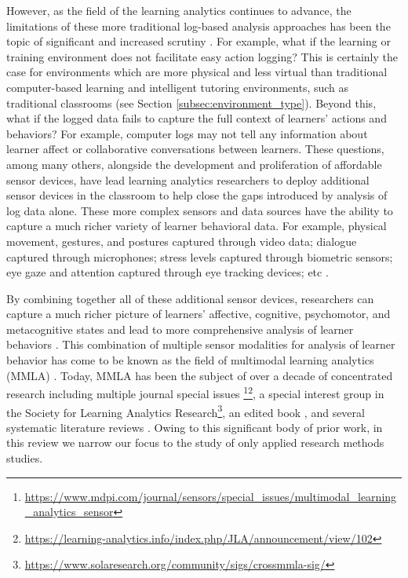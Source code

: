 \documentclass[manuscript,screen,review]{acmart}
\begin{document}
However, as the field of the learning analytics continues to advance, the limitations of these more traditional log-based analysis approaches has been the topic of significant and increased scrutiny \cite{ochoa2017multimodal}. For example, what if the learning or training environment does not facilitate easy action logging? This is certainly the case for environments which are more physical and less virtual than traditional computer-based learning and intelligent tutoring environments, such as traditional classrooms (see Section \ref{subsec:environment_type}). Beyond this, what if the logged data fails to capture the full context of learners' actions and behaviors? For example, computer logs may not tell any information about learner affect or collaborative conversations between learners. These questions, among many others, alongside the development and proliferation of affordable sensor devices, have lead learning analytics researchers to deploy additional sensor devices in the classroom to help close the gaps introduced by analysis of log data alone. These more complex sensors and data sources have the ability to capture a much richer variety of learner behavioral data. For example, physical movement, gestures, and postures captured through video data; dialogue captured through microphones; stress levels captured through biometric sensors; eye gaze and attention captured through eye tracking devices; etc \cite{vatral2022using}. 

By combining together all of these additional sensor devices, researchers can capture a much richer picture of learners' affective, cognitive, psychomotor, and metacognitive states and lead to more comprehensive analysis of learner behaviors \cite{blikstein2016multimodal}. This combination of multiple sensor modalities for analysis of learner behavior has come to be known as the field of multimodal learning analytics (MMLA) \cite{blikstein2013multimodal, blikstein2016multimodal, worsley_multimodal_2018}. Today, MMLA has been the subject of over a decade of concentrated research including multiple journal special issues \cite{BJETSpecialIssue}\footnote{\href{https://www.mdpi.com/journal/sensors/special_issues/multimodal_learning_analytics_sensor}{https://www.mdpi.com/journal/sensors/special\_issues/multimodal\_learning\_analytics\_sensor}}\footnote{\href{https://learning-analytics.info/index.php/JLA/announcement/view/102}{https://learning-analytics.info/index.php/JLA/announcement/view/102}}, a special interest group in the Society for Learning Analytics Research\footnote{\href{https://www.solaresearch.org/community/sigs/crossmmla-sig/}{https://www.solaresearch.org/community/sigs/crossmmla-sig/}}, an edited book \cite{MMLAHandbook}, and several systematic literature reviews \cite{Chango2022, Alwahaby2022, Shankar2018, Crescenzi2020, Mu2020, DiMitri2018, worsley_multimodal_2018}. Owing to this significant body of prior work, in this review we narrow our focus to the study of only applied research methods studies.
\end{document}
